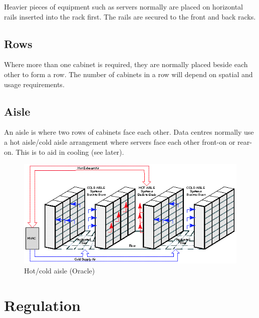 \documentclass{pgnotes}
\begin{document}
Heavier pieces of equipment such as servers normally are placed on horizontal rails inserted into the rack first.
The rails are secured to the front and back racks.

\subsection{Rows}

Where more than one cabinet is required, they are normally placed beside each other to form a row.
The number of cabinets in a row will depend on spatial and usage requirements.

\subsection{Aisle}

An aisle is where two rows of cabinets face each other.
Data centres normally use a hot aisle/cold aisle arrangement where servers face each other front-on or rear-on.
This is to aid in cooling (see later).

\begin{figure}[htbp]
  \centering
  \includegraphics[width=1.0\linewidth]{hot_cold_aisle_oracle}
  \caption{Hot/cold aisle (Oracle)}
  \label{fig:hot-cold-aisle}
\end{figure}



\section{Regulation}
\end{document}
